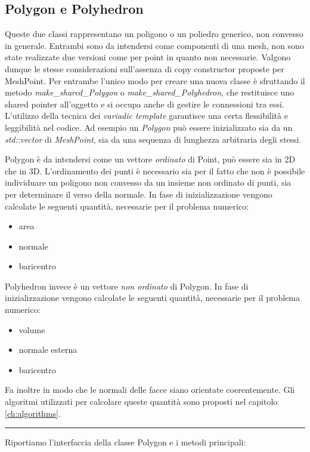 \documentclass[oneside,12pt]{book}  %
\theoremstyle{plain}
\theoremstyle{definition}
\theoremstyle{remark}
\numberwithin{equation}{chapter} %
\begin{document}
\subsection{Polygon e Polyhedron}
Queste due classi rappresentano un poligono o un poliedro generico,
non convesso in generale. Entrambi sono da intendersi come componenti
di una mesh, non sono state realizzate due versioni come per point in
quanto non necessarie. Valgono dunque le stesse considerazioni
sull'assenza di copy constructor proposte per MeshPoint.
Per entrambe l'unico modo per creare una nuova
classe \`e sfruttando il metodo \textit{make\_shared\_Polygon} o
\textit{make\_shared\_Polyhedron}, che restituisce uno shared pointer
all'oggetto e si occupa anche di gestire le connessioni tra
essi. L'utilizzo della tecnica dei \textit{variadic template}
garantisce una certa flessibilit\`a e leggibilit\`a nel codice. Ad
esempio un \textit{Polygon} pu\`o essere inizializzato sia da un
\textit{std::vector} di \textit{MeshPoint}, sia da una sequenza di
lunghezza arbitraria degli stessi.

Polygon \`e da intendersi come un vettore \textit{ordinato} di Point,
pu\`o essere sia in 2D che in 3D. L'ordinamento dei punti \`e necessario
sia per il fatto che non \`e possibile individuare un poligono non
convesso da un insieme non ordinato di punti, sia per determinare il
verso della normale. In fase di inizializzazione vengono calcolate le
seguenti quantit\`a, necessarie per il problema numerico:
\begin{itemize}
\item area
\item normale
\item baricentro
\end{itemize}

 Polyhedron invece \`e un vettore \textit{non ordinato} di Polygon. 
In fase di inizializzazione vengono calcolate le seguenti quantit\`a, 
necessarie per il problema numerico:
\begin{itemize}
\item volume 
\item normale esterna
\item baricentro
\end{itemize}
Fa inoltre in modo che le normali delle facce siano orientate
coerentemente. Gli algoritmi utilizzati per calcolare queste
quantit\`a sono proposti nel capitolo \ref{ch:algorithms}.

\noindent\rule{14cm}{1pt}

Riportiamo l'interfaccia della classe Polygon e i metodi principali:
\end{document}

